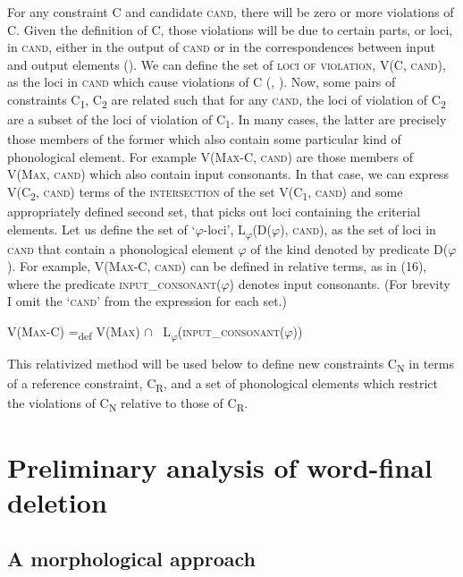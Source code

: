 \documentclass[output=paper,
modfonts
]{LSP/langsci}
\begin{document}
For any constraint C and candidate \textsc{cand,} there will be zero or more violations of C. Given the definition of C, those violations will be due to certain parts, or loci, in \textsc{cand}, either in the output of \textsc{cand} or in the correspondences between input and output elements (\citealt{mccarthy1995r}). We can define the set of \textsc{loci of violation,} V(C, \textsc{cand}), as the loci in \textsc{cand} which cause violations of C (\citealt{mccarthy2003}, \citealt{lubowicz2005}). Now, some pairs of constraints C\textsubscript{1}, C\textsubscript{2} are related such that for any \textsc{cand}, the loci of violation of C\textsubscript{2} are a subset of the loci of violation of C\textsubscript{1}. In many cases, the latter are precisely those members of the former which also contain some particular kind of phonological element. For example V(\textsc{Max}{}-C, \textsc{cand}) are those members of V(\textsc{Max}, \textsc{cand}) which also contain input consonants. In that case, we can express V(C\textsubscript{2}, \textsc{cand}) terms of the \textsc{intersection} of the set V(C\textsubscript{1}, \textsc{cand}) and some appropriately defined second set, that picks out loci containing the criterial elements. Let us define the set of `$\varphi $-loci', L\textsubscript{$\varphi $}(D($\varphi $), \textsc{cand}), as the set of loci in \textsc{cand} that contain a phonological element $\varphi $ of the kind denoted by predicate D($\varphi $). For example, V(\textsc{Max}{}-C, \textsc{cand}) can be defined in relative terms, as in (16), where the predicate \textsc{input\_consonant}($\varphi $) denotes input consonants. (For brevity I omit the `\textsc{cand}' from the expression for each set.)

\ea 
V(\textsc{Max-C})  =\textsubscript{def} V(\textsc{Max}) ${\cap}$ \ L\textsubscript{$\varphi $}(\textsc{input\_consonant}($\varphi $))
\z

This relativized method will be used below to define new constraints C\textsubscript{N} in terms of a reference constraint, C\textsubscript{R}, and a set of phonological elements which restrict the violations of C\textsubscript{N} relative to those of C\textsubscript{R}.

\section[Preliminary analysis of word{}-final deletion]{Preliminary analysis of word-final deletion}
\label{bkm:Ref335660381}\subsection[A morphological approach]{A morphological approach}
\end{document}
